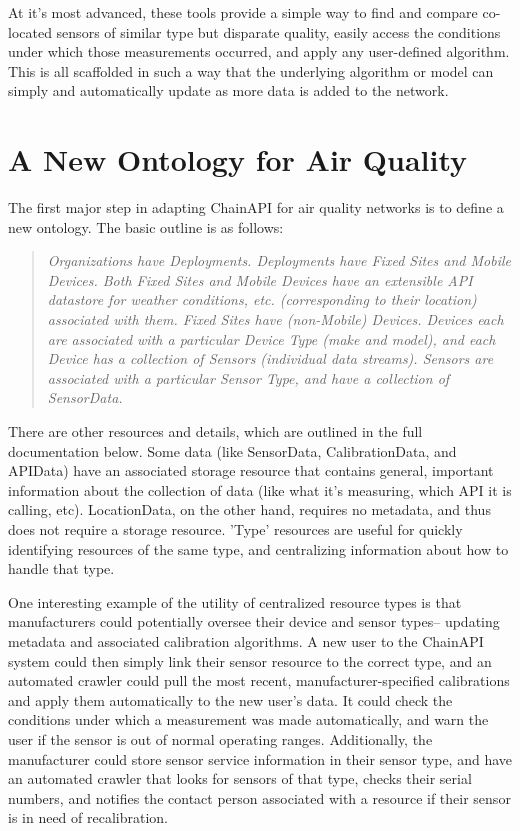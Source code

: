 At it's most advanced, these tools provide a simple way to find and compare co-located sensors of similar type but disparate quality, easily access the conditions under which those measurements occurred, and apply any user-defined algorithm.  This is all scaffolded in such a way that the underlying algorithm or model can simply and automatically update as more data is added to the network.    


\section{A New Ontology for Air Quality}

The first major step in adapting ChainAPI for air quality networks is to define a new ontology.  The basic outline is as follows:

\begin{quote}
\textit{Organizations have Deployments.  Deployments have Fixed Sites and Mobile Devices.  Both Fixed Sites and Mobile Devices have an extensible API datastore for weather conditions, etc. (corresponding to their location) associated with them.  Fixed Sites have (non-Mobile) Devices.  Devices each are associated with a particular Device Type (make and model), and each Device has a collection of Sensors (individual data streams).  Sensors are associated with a particular Sensor Type, and have a collection of SensorData.}
\end{quote}

There are other resources and details, which are outlined in the full documentation below.  Some data (like SensorData, CalibrationData, and APIData) have an associated storage resource that contains general, important information about the collection of data (like what it's measuring, which API it is calling, etc).  LocationData, on the other hand, requires no metadata, and thus does not require a storage resource.  'Type' resources are useful for quickly identifying resources of the same type, and centralizing information about how to handle that type.  

One interesting example of the utility of centralized resource types is that manufacturers could potentially oversee their device and sensor types-- updating metadata and associated calibration algorithms.  A new user to the ChainAPI system could then simply link their sensor resource to the correct type, and an automated crawler could pull the most recent, manufacturer-specified calibrations and apply them automatically to the new user's data.  It could check the conditions under which a measurement was made automatically, and warn the user if the sensor is out of normal operating ranges.  Additionally, the manufacturer could store sensor service information in their sensor type, and have an automated crawler that looks for sensors of that type, checks their serial numbers, and notifies the contact person associated with a resource if their sensor is in need of recalibration.  
   
